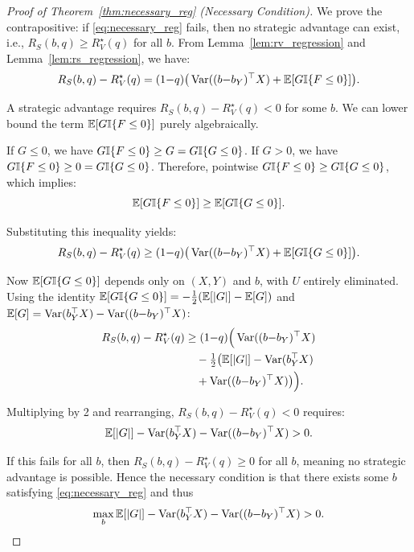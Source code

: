 \begin{proof}[Proof of Theorem~\ref{thm:necessary_reg} (Necessary Condition)]
We prove the contrapositive: if \eqref{eq:necessary_reg} fails, then no strategic advantage can exist, i.e., $R_S(b,q) \ge R_V^\star(q)$ for all $b$.
From Lemma~\ref{lem:rv_regression} and Lemma~\ref{lem:rs_regression}, we have:
\begin{equation*}
  R_S(b,q) - R_V^\star(q) = (1{-}q)\big( \operatorname{Var}((b{-}b_Y)^\top X) + \mathbb{E}[G\mathbb{I}\{F \le 0\}] \big).
\end{equation*}

A strategic advantage requires $R_S(b,q) - R_V^\star(q) < 0$ for some $b$. We can lower bound the term $\mathbb{E}[G\mathbb{I}\{F \le 0\}]$ purely algebraically. 

If $G \le 0$, we have $G\mathbb{I}\{F \le 0\} \ge G = G\mathbb{I}\{G \le 0\}$. If $G > 0$, we have $G\mathbb{I}\{F \le 0\} \ge 0 = G\mathbb{I}\{G \le 0\}$. Therefore, pointwise $G\mathbb{I}\{F \le 0\} \ge G\mathbb{I}\{G \le 0\}$, which implies:
\begin{equation*}
  \mathbb{E}[G\mathbb{I}\{F \le 0\}] \ge \mathbb{E}[G\mathbb{I}\{G \le 0\}].
\end{equation*}

Substituting this inequality yields:
\begin{equation*}
  R_S(b,q) - R_V^\star(q) \ge (1{-}q)\big(\operatorname{Var}((b{-}b_Y)^\top X) + \mathbb{E}[G\mathbb{I}\{G \le 0\}]\big).
\end{equation*}

Now $\mathbb{E}[G\mathbb{I}\{G \le 0\}]$ depends only on $(X, Y)$ and $b$, with $U$ entirely eliminated. Using the identity $\mathbb{E}[G\mathbb{I}\{G \le 0\}] = -\frac{1}{2}(\mathbb{E}[|G|] - \mathbb{E}[G])$ and $\mathbb{E}[G] = \operatorname{Var}(b_Y^\top X) - \operatorname{Var}((b{-}b_Y)^\top X)$:
\begin{align*}
  R_S(b,q) - R_V^\star(q) &\ge (1{-}q)\Big(\operatorname{Var}((b{-}b_Y)^\top X) \\
  &\quad - \tfrac{1}{2}\big(\mathbb{E}[|G|] - \operatorname{Var}(b_Y^\top X) \\
  &\quad + \operatorname{Var}((b{-}b_Y)^\top X)\big)\Big).
\end{align*}

Multiplying by 2 and rearranging, $R_S(b,q) - R_V^\star(q) < 0$ requires:
\begin{equation*}
  \mathbb{E}[|G|] - \operatorname{Var}(b_Y^\top X) - \operatorname{Var}((b{-}b_Y)^\top X) > 0.
\end{equation*}

If this fails for all $b$, then $R_S(b,q) - R_V^\star(q) \ge 0$ for all $b$, meaning no strategic advantage is possible. Hence the necessary condition is that there exists some $b$ satisfying \eqref{eq:necessary_reg} and thus 
\begin{equation*}
  \max_b\mathbb{E}[|G|] - \operatorname{Var}(b_Y^\top X) - \operatorname{Var}((b{-}b_Y)^\top X) > 0.
\end{equation*}
\end{proof}


